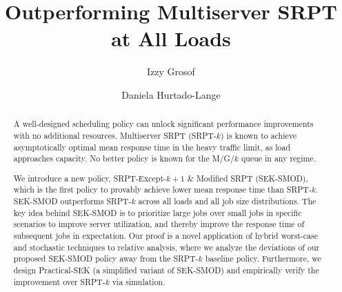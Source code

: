 \documentclass[acmsmall]{acmart}
\begin{document}
\title{Outperforming Multiserver SRPT at All Loads}

\author{Izzy Grosof}
\author{Daniela Hurtado-Lange}




\begin{abstract}
  A well-designed scheduling policy can unlock significant performance improvements with no additional resources. Multiserver SRPT (SRPT-$k$) is known to achieve asymptotically optimal mean response time in the heavy traffic limit, as load approaches capacity. No better policy is known for the M/G/$k$ queue in any regime.
  
  We introduce a new policy, SRPT-Except-$k+1$ \& Modified SRPT (SEK-SMOD), which is the first policy to provably achieve lower mean response time than SRPT-$k$. SEK-SMOD outperforms SRPT-$k$ across all loads and all job size distributions.  The key idea behind SEK-SMOD is to prioritize large jobs over small jobs in specific scenarios to improve server utilization, and thereby improve the response time of subsequent jobs in expectation. 
  Our proof is a novel application of hybrid worst-case and stochastic techniques to relative analysis, where we analyze the deviations of our proposed SEK-SMOD policy away from the SRPT-$k$ baseline policy. Furthermore, we design Practical-SEK (a simplified variant of SEK-SMOD) and empirically verify the improvement over SRPT-$k$ via simulation.
\end{abstract}
\end{document}
